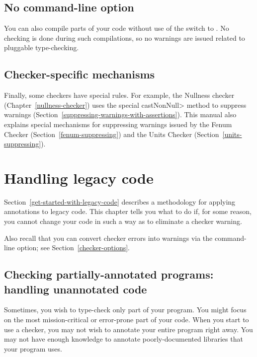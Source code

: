 \section{No  command-line option\label{no-processor}}

You can also compile parts of your code without use of the
 switch to .  No checking is done during
such compilations, so no warnings are issued related to pluggable
type-checking.


\section{Checker-specific mechanisms\label{checker-specific-suppression}}

Finally, some checkers have special rules.  For example, the Nullness
checker (Chapter~\ref{nullness-checker}) uses
the special \<castNonNull> method to suppress warnings
(Section~\ref{suppressing-warnings-with-assertions}).
This manual also explains special mechanisms for
suppressing warnings issued by the Fenum Checker
(Section~\ref{fenum-suppressing}) and the Units Checker
(Section~\ref{units-suppressing}).



\htmlhr
\chapter{Handling legacy code\label{legacy-code}}

Section~\ref{get-started-with-legacy-code} describes a methodology for
applying annotations to legacy code.  This chapter tells you what to do if,
for some reason, you cannot change your code in such a way as to eliminate
a checker warning.

Also recall that you can convert checker errors into warnings via the
 command-line option; see Section~\ref{checker-options}.


\section{Checking partially-annotated programs:  handling unannotated code\label{unannotated-code}}

Sometimes, you wish to type-check only part of your program.
You might focus on the most mission-critical or error-prone part of your
code.  When you start to use a checker, you may not wish to annotate
your entire program right away.
You may not have
enough knowledge to annotate poorly-documented libraries that your program uses.

